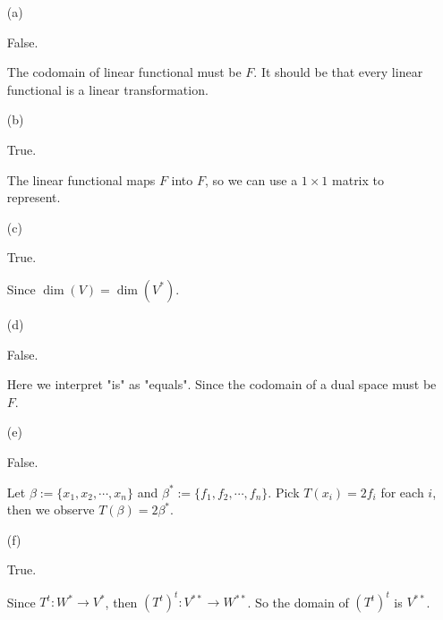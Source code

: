 \begin{Exercise}
\begin{enumerate}[(a)]
\item[(a)]
\begin{answer}
False.
\end{answer}
\begin{solution}
The codomain of linear functional must be $F$. It should be that every linear functional is a linear transformation.
\end{solution}

\item[(b)]
\begin{answer}
True.
\end{answer}
\begin{solution}
The linear functional maps $F$ into $F$, so we can use a $1\times 1$ matrix to represent.
\end{solution}

\item[(c)]
\begin{answer}
True.
\end{answer}
\begin{solution}
Since $\dim(V) = \dim(V^*)$.
\end{solution}

\item[(d)]
\begin{answer}
False.
\end{answer}
\begin{solution}
Here we interpret "is" as "equals". Since the codomain of a dual space must be $F$.
\end{solution}

\item[(e)]
\begin{answer}
False.
\end{answer}
\begin{solution}
Let $\beta := \{x_1,x_2,\cdots,x_n\}$ and $\beta^* := \{f_1,f_2,\cdots,f_n\}$. Pick $T(x_i) = 2f_i$ for each $i$, then we observe $T(\beta) = 2\beta^*$.
\end{solution}

\item[(f)]
\begin{answer}
True.
\end{answer}
\begin{solution}
Since $T^t:W^*\to V^*$, then $(T^t)^t:V^{**}\to W^{**}$. So the domain of $(T^t)^t$ is $V^{**}$.
\end{solution}


\end{enumerate}
\end{Exercise}
